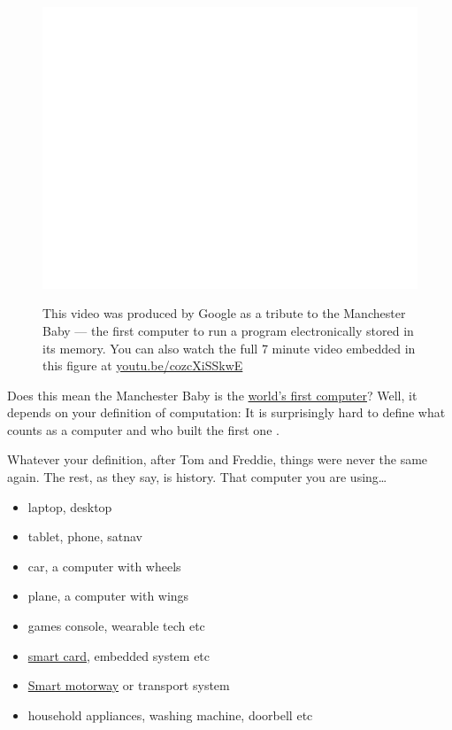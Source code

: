 \documentclass[
  12pt,
]{book}
\providecommand{\tightlist}{%
  \setlength{\itemsep}{0pt}\setlength{\parskip}{0pt}}
\begin{document}
\begin{figure}

{\centering \href{https://www.youtube.com/embed/cozcXiSSkwE}{\includegraphics[width=0.99\linewidth]{duncan-hull_files/figure-latex/baby-fig-1} }

}

\caption{This video was produced by Google as a tribute to the Manchester Baby --- the first computer to run a program electronically stored in its memory. You can also watch the full 7 minute video embedded in this figure at \href{https://youtu.be/cozcXiSSkwE}{youtu.be/cozcXiSSkwE} \citep{youtube-baby}}\label{fig:baby-fig}
\end{figure}



Does this mean the Manchester Baby is the \href{https://www.computerhope.com/issues/ch000984.htm}{world's first computer}? Well, it depends on your definition of computation: It is surprisingly hard to define what counts as a computer and who built the first one \citep{firstcomputer}.

Whatever your definition, after Tom and Freddie, things were never the same again. The rest, as they say, is history. That computer you are using\ldots{}

\begin{itemize}
\tightlist
\item
  laptop, desktop
\item
  tablet, phone, satnav
\item
  car, a computer with wheels
\item
  plane, a computer with wings
\item
  games console, wearable tech etc
\item
  \href{https://en.wikipedia.org/wiki/Smart_card}{smart card}, embedded system etc
\item
  \href{https://en.wikipedia.org/wiki/Smart_motorway}{Smart motorway} or transport system
\item
  household appliances, washing machine, doorbell etc
\end{itemize}
\end{document}
